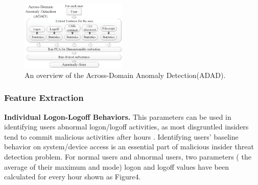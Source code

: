 \documentclass[conference]{IEEEtran}
\begin{document}
\begin{figure}[htb]
\centerline{\includegraphics[width = 0.45\textwidth]{figure/figure3.eps}}
\caption{An overview of the Across-Domain Anomaly Detection(ADAD).}
\label{fig}
\end{figure}

\subsubsection{Feature Extraction}


\textbf{Individual Logon-Logoff Behaviors.} This parameters can be used in identifying users abnormal logon/logoff activities, as most disgruntled insiders tend to commit malicious activities after hours \cite{b40}. Identifying users’ baseline behavior on system/device access is an essential part of malicious insider threat detection problem. For normal users and abnormal users, two parameters ( the average of their maximum and mode) logon and logoff values have been calculated for every hour shown as Figure4. 
\end{document}

